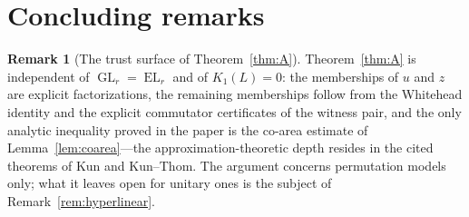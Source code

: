 \documentclass[11pt]{amsart}
\theoremstyle{definition}
\newtheorem{remark}[theorem]{Remark}
\theoremstyle{plain}
\newcommand{\GL}{\operatorname{GL}}
\newcommand{\EL}{\operatorname{EL}}
\begin{document}
\section{Concluding remarks}\label{sec:remarks}

\begin{remark}[The trust surface of Theorem~\ref{thm:A}]\label{rem:scope-final}
Theorem~\ref{thm:A} is independent of \(\GL_r=\EL_r\) and of \(K_1(L)=0\): the memberships of \(u\) and \(z\) are explicit factorizations, the remaining memberships follow from the Whitehead identity and the explicit commutator certificates of the witness pair, and the only analytic inequality proved in the paper is the co-area estimate of Lemma~\ref{lem:coarea}---the approximation-theoretic depth resides in the cited theorems of Kun and Kun--Thom.  The argument concerns permutation models only; what it leaves open for unitary ones is the subject of Remark~\ref{rem:hyperlinear}.
\end{remark}
\end{document}

